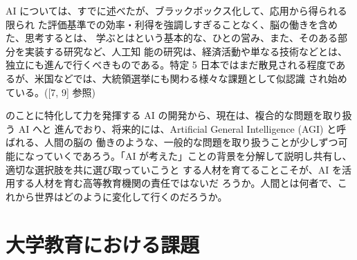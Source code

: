 \documentclass[
]{book}
\theoremstyle{definition}
\theoremstyle{definition}
\theoremstyle{definition}
\theoremstyle{definition}
\theoremstyle{remark}
\begin{document}
AI については、すでに述べたが、ブラックボックス化して、応用から得られる限られ た評価基準での効率・利得を強調しすぎることなく、脳の働きを含めた、思考するとは、 学ぶとはという基本的な、ひとの営み、また、そのある部分を実装する研究など、人工知 能の研究は、経済活動や単なる技術などとは、独立にも進んで行くべきものである。特定
5 日本ではまだ散見される程度であるが、米国などでは、大統領選挙にも関わる様々な課題として似認識 され始めている。({[}7, 9{]} 参照)

のことに特化して力を発揮する AI の開発から、現在は、複合的な問題を取り扱う AI へと 進んでおり、将来的には、Artificial General Intelligence (AGI) と呼ばれる、人間の脳の 働きのような、一般的な問題を取り扱うことが少しずつ可能になっていくであろう。「AI が考えた」ことの背景を分解して説明し共有し、適切な選択肢を共に選び取っていこうと する人材を育てることこそが、AI を活用する人材を育む高等教育機関の責任ではないだ ろうか。人間とは何者で、これから世界はどのように変化して行くのだろうか。

\hypertarget{ux5927ux5b66ux6559ux80b2ux306bux304aux3051ux308bux8ab2ux984c}{%
\section{大学教育における課題}\label{ux5927ux5b66ux6559ux80b2ux306bux304aux3051ux308bux8ab2ux984c}}
\end{document}
